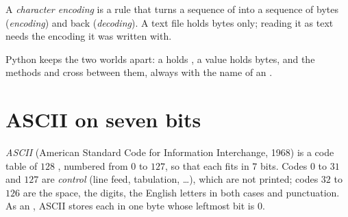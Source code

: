 \begin{definition}\label{def:g10:text-encodings:encoding}
A \emph{character encoding} is a rule that turns a sequence of  into a sequence of
bytes (\emph{encoding}) and back (\emph{decoding}). A text file holds bytes only; reading it as text needs the
encoding it was written with.
\end{definition}

Python keeps the two worlds apart: a  holds , a  value holds bytes, and the methods
 and  cross between them, always with the name of an .

\section{ASCII on seven bits}\label{sec:g10:text-encodings:ascii}

\begin{definition}[ASCII]\label{def:g10:text-encodings:ascii}
\emph{ASCII} (American Standard Code for Information Interchange, 1968) is a code table of $128$
, numbered from $0$ to $127$, so that each fits in $7$ bits. Codes $0$ to $31$ and $127$ are
\emph{control } (line feed, tabulation, \dots), which are not printed; codes $32$ to $126$ are the space,
the digits, the English letters in both cases and punctuation. As an , ASCII stores each  in one
byte whose leftmost bit is $0$.
\end{definition}

